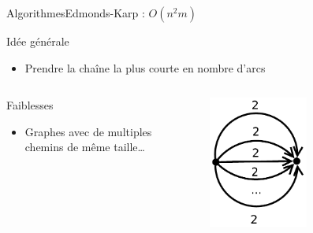 \begin{frame}{Algorithmes}{Edmonds-Karp : $O(n^2m)$}

\begin{block}{Idée générale}
\begin{itemize}
\item Prendre la chaîne la plus courte en nombre d'arcs
\end{itemize}
\end{block}

\begin{columns}
  \begin{column}[l]{0.6\textwidth}
\begin{block}{Faiblesses}
    \begin{itemize}
      \item Graphes avec de multiples chemins de même taille\dots
    \end{itemize}
    \end{block}
  \end{column}
 \begin{column}[r]{0.4\textwidth}
    \includegraphics[width=0.5\textwidth]{img/anti_ek}
  \end{column}
\end{columns}

\end{frame}

